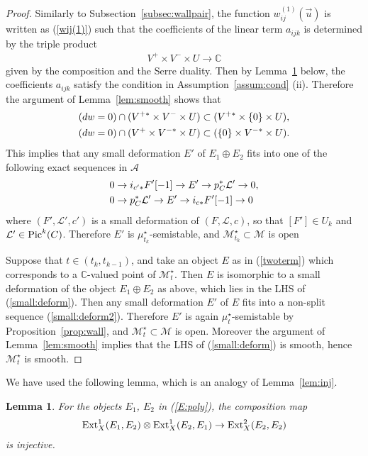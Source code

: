 \documentclass[11pt]{amsart}
\theoremstyle{plain}
\newtheorem{lem}[thm]{Lemma}
\newcommand{\aA}{\mathcal{A}}
\newcommand{\lL}{\mathcal{L}}
\newcommand{\mM}{\mathcal{M}}
\newcommand{\Pic}{\mathop{\rm Pic}\nolimits}
\newcommand{\Ext}{\mathop{\rm Ext}\nolimits}
\begin{document}
\begin{proof}
Similarly to Subsection~\ref{subsec:wallpair}, 
the function 
$w_{ij}^{(1)}(\vec{u})$ is written 
as (\ref{wij(1)})
such that the coefficients of the linear term
$a_{ijk}$ is determined by the 
triple product
\begin{align*}
V^+ \times V^- \times U  \to \mathbb{C}
\end{align*}
given by the composition and the Serre duality. 
Then by Lemma~\ref{lem:inj2} below, 
the coefficients $a_{ijk}$ satisfy the 
condition in Assumption~\ref{assum:cond} (ii). 
Therefore  
the argument of Lemma~\ref{lem:smooth} shows that 
\begin{align}\label{small:deform}
&(dw=0) \cap  (V^{+\ast} \times V^- \times U)
\subset (V^{+\ast} \times \{0\} \times U), \\
\notag
&(dw=0) \cap  (V^+ \times V^{-\ast} \times U)
\subset (\{0\} \times V^{-\ast} \times U).
\end{align}
This implies that any small deformation $E'$ of 
$E_1 \oplus E_2$ fits into one of the following exact sequences
in $\aA$
\begin{align}\label{small:deform2}
&0 \to i_{c'\ast}F'[-1] \to E' \to p_C^{\ast} \lL' \to 0, \\ 
\notag
&0 \to p_C^{\ast}\lL' \to E' \to i_{c\ast}F'[-1] \to 0
\end{align}
where $(F', \lL', c')$ is a small deformation of $(F, \lL, c)$, so that 
$[F'] \in U_k$ and $\lL' \in \Pic^k(C)$. 
Therefore $E'$ is $\mu_{t_k}^{\star}$-semistable,
and $\mM_{t_k}^{\star} \subset \mM$ is open 

Suppose that $t \in (t_{k}, t_{k-1})$, and take 
an object $E$ as in (\ref{twoterm})
which corresponds to a $\mathbb{C}$-valued point of 
$\mM_t^{\star}$. 
Then $E$ is isomorphic to a small deformation of the object
$E_1 \oplus E_2$ as above, which lies in the 
LHS of (\ref{small:deform}). 
Then any small deformation $E'$ of $E$ 
fits into a non-split sequence (\ref{small:deform2}). 
Therefore 
$E'$ is again $\mu_t^{\star}$-semistable by 
Proposition~\ref{prop:wall}, 
and $\mM_t^{\star} \subset \mM$ is open. 
Moreover the argument of Lemma~\ref{lem:smooth}
implies that the LHS of (\ref{small:deform}) is smooth, 
hence $\mM_t^{\star}$ is smooth. 
\end{proof}
We have used the following lemma, 
which is an analogy of Lemma~\ref{lem:inj}. 
\begin{lem}\label{lem:inj2}
For the objects $E_1$, $E_2$ in (\ref{E:poly}), the 
composition map 
\begin{align}\label{compose:inj}
\Ext_X^1(E_1, E_2) \otimes \Ext_X^1(E_2, E_1)
 \to \Ext_X^2(E_2, E_2)
\end{align}
is injective. 
\end{lem}
\end{document}
